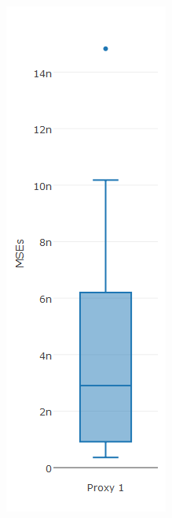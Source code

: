 \begin{figure}[!h]
{\begin{subfigure}{.25\linewidth}
  \includegraphics[width=\linewidth]{img/10ysigmaMsebpNaive.png}

\end{subfigure}}
\end{figure}
